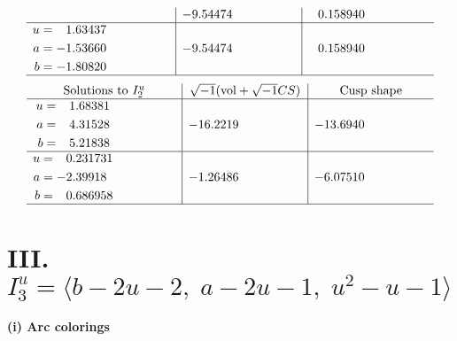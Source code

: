 \documentclass[1p]{elsarticle_modified}
\theoremstyle{definition}
\newcommand{\I}{\sqrt{-1}}
\begin{document}
$$\begin{array}{c|c|c}
 & -9.54474\phantom{ +0.000000I} & \phantom{-}0.158940\phantom{ +0.000000I} \\ \hline\begin{aligned}
u &= \phantom{-}1.63437\phantom{ +0.000000I} \\
a &= -1.53660\phantom{ +0.000000I} \\
b &= -1.80820\phantom{ +0.000000I}\end{aligned}
 & -9.54474\phantom{ +0.000000I} & \phantom{-}0.158940\phantom{ +0.000000I}\\
 \hline 
 \end{array}$$\newpage$$\begin{array}{c|c|c}  
\text{Solutions to }I^u_{2}& \I (\text{vol} + \sqrt{-1}CS) & \text{Cusp shape}\\
 \hline 
\begin{aligned}
u &= \phantom{-}1.68381\phantom{ +0.000000I} \\
a &= \phantom{-}4.31528\phantom{ +0.000000I} \\
b &= \phantom{-}5.21838\phantom{ +0.000000I}\end{aligned}
 & -16.2219\phantom{ +0.000000I} & -13.6940\phantom{ +0.000000I} \\ \hline\begin{aligned}
u &= \phantom{-}0.231731\phantom{ +0.000000I} \\
a &= -2.39918\phantom{ +0.000000I} \\
b &= \phantom{-}0.686958\phantom{ +0.000000I}\end{aligned}
 & -1.26486\phantom{ +0.000000I} & -6.07510\phantom{ +0.000000I}\\
 \hline 
 \end{array}$$\newpage\newpage\renewcommand{\arraystretch}{1}
\centering \section*{III. $I^u_{3}= \langle b-2 u-2,\;a-2 u-1,\;u^2- u-1 \rangle$}
\flushleft \textbf{(i) Arc colorings}\\
\end{document}
